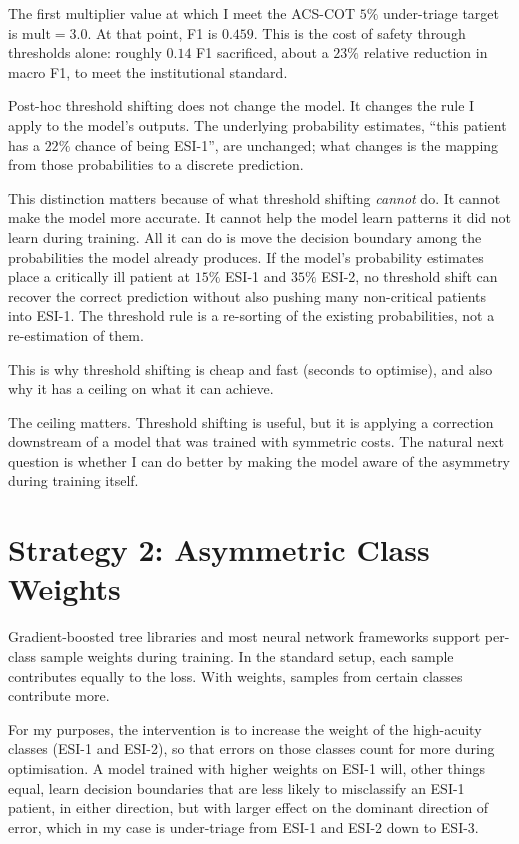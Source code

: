 The first multiplier value at which I meet the ACS-COT $5\%$ under-triage target is $\text{mult} = 3.0$. At that point, F1 is $0.459$. This is the cost of safety through thresholds alone: roughly $0.14$ F1 sacrificed, about a $23\%$ relative reduction in macro F1, to meet the institutional standard.

\begin{notebox}
Post-hoc threshold shifting does not change the model. It changes the rule I apply to the model's outputs. The underlying probability estimates, ``this patient has a $22\%$ chance of being ESI-1'', are unchanged; what changes is the mapping from those probabilities to a discrete prediction.

This distinction matters because of what threshold shifting \emph{cannot} do. It cannot make the model more accurate. It cannot help the model learn patterns it did not learn during training. All it can do is move the decision boundary among the probabilities the model already produces. If the model's probability estimates place a critically ill patient at $15\%$ ESI-1 and $35\%$ ESI-2, no threshold shift can recover the correct prediction without also pushing many non-critical patients into ESI-1. The threshold rule is a re-sorting of the existing probabilities, not a re-estimation of them.

This is why threshold shifting is cheap and fast (seconds to optimise), and also why it has a ceiling on what it can achieve.
\end{notebox}

The ceiling matters. Threshold shifting is useful, but it is applying a correction downstream of a model that was trained with symmetric costs. The natural next question is whether I can do better by making the model aware of the asymmetry during training itself.

\section{Strategy 2: Asymmetric Class Weights}

Gradient-boosted tree libraries and most neural network frameworks support per-class sample weights during training. In the standard setup, each sample contributes equally to the loss. With weights, samples from certain classes contribute more.

For my purposes, the intervention is to increase the weight of the high-acuity classes (ESI-1 and ESI-2), so that errors on those classes count for more during optimisation. A model trained with higher weights on ESI-1 will, other things equal, learn decision boundaries that are less likely to misclassify an ESI-1 patient, in either direction, but with larger effect on the dominant direction of error, which in my case is under-triage from ESI-1 and ESI-2 down to ESI-3.

